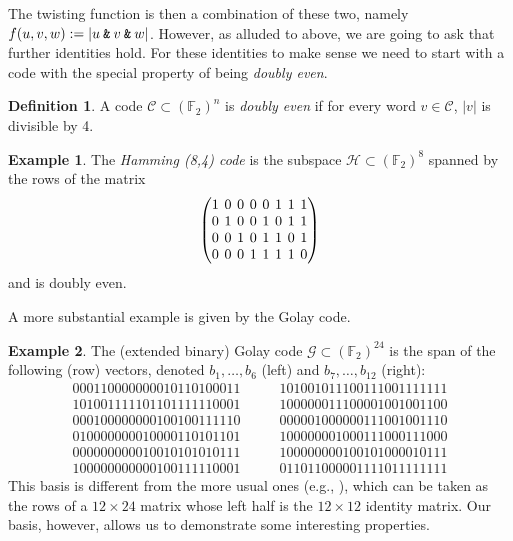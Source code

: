 \documentclass{article}
\theoremstyle{plain}
\theoremstyle{definition}
\newtheorem*{definition}{Definition}
\newtheorem{example}{Example}
\def \cC {\mathcal{C}}
\def \cG {\mathcal{G}}
\def \FF {\mathbb{F}}
\newcommand{\AND}{\mathbin{\textup{\texttt{\&}}}}
\begin{document}
The twisting function is then a combination of these two, namely $f(u,v,w) := |u\AND v\AND w|$.
However, as alluded to above, we are going to ask that further identities hold. 
For these identities to make sense we need to start with a code with the special property of being \emph{doubly even}.

\begin{definition}
A code $\cC \subset (\FF_2)^n$ is \emph{doubly even} if for every word $v\in \cC$, $|v|$ is divisible by 4. 
\end{definition}


\begin{example}\label{example:Hamming}
The \emph{Hamming (8,4) code} is the subspace $\mathcal{H} \subset (\FF_2)^8$ spanned by the rows of the matrix
\[
\begingroup %
\setlength\arraycolsep{2pt}
\begin{pmatrix}
1&0&0&0&0&1&1&1\\
0&1&0&0&1&0&1&1\\
0&0&1&0&1&1&0&1\\
0&0&0&1&1&1&1&0
\end{pmatrix}
\endgroup
\]
and is doubly even.
\end{example}

A more substantial example is given by the Golay code.

\begin{example}\label{example:Golay}
The (extended binary) Golay code $\cG \subset (\FF_2)^{24}$ is the span of the following (row) vectors, denoted $b_1,\ldots,b_6$ (left) and $b_7,\ldots,b_{12}$ (right):
\[	
	 \begin{array}{c}
     000110000000010110100011 \\
     101001111101101111110001 \\
     000100000000100100111110 \\
     010000000010000110101101 \\
     000000000010010101010111 \\
     100000000000100111110001
     \end{array}
\qquad
    \begin{array}{c}
	 101001011100111001111111 \\
	 100000011100001001001100 \\
	 000001000000111001001110 \\
	 100000001000111000111000 \\
	 100000000100101000010111 \\
	 011011000001111011111111
	 \end{array}
\]
This basis is different from the more usual ones (e.g., \cite[Figure 3.4]{SPLAG}), which can be taken as the rows of a $12\times 24$ matrix whose left half is the $12\times 12$ identity matrix.
Our basis, however, allows us to demonstrate some interesting properties.
\end{example}
\end{document}
